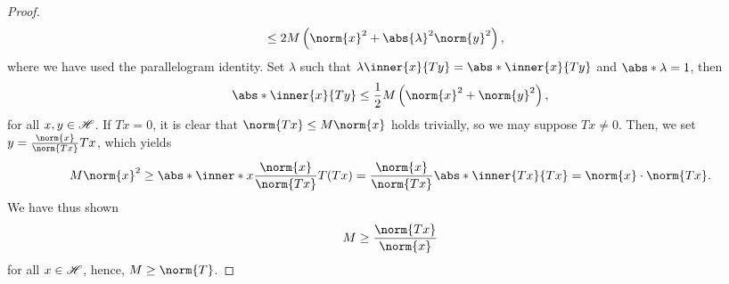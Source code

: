 \begin{proof}
\begin{align*}
                                                        &\leq 2M\left(\norm{x}^2 + \abs{\lambda}^2 \norm{y}^2\right),
    \end{align*}
    where we have used the parallelogram identity. Set \(\lambda\) such that \(\lambda \inner{x}{Ty} = \abs*{\inner{x}{Ty}}\) and \(\abs*{\lambda} = 1\), then
    \begin{equation*}
        \abs*{\inner{x}{Ty}} \leq \frac12 M \left(\norm{x}^2 + \norm{y}^2\right),
    \end{equation*}
    for all \(x, y \in \mathscr{H}\). If \(Tx = 0\), it is clear that \(\norm{Tx} \leq M \norm{x}\) holds trivially, so we may suppose \(Tx \neq 0\). Then, we set \(y = \frac{\norm{x}}{\norm{Tx}}Tx\), which yields
    \begin{equation*}
        M \norm{x}^2 \geq \abs*{\inner*{x}{\frac{\norm{x}}{\norm{Tx}}T(Tx)}} = \frac{\norm{x}}{\norm{Tx}} \abs*{\inner{Tx}{Tx}} = \norm{x}\cdot \norm{Tx}.
    \end{equation*}
    We have thus shown
    \begin{equation*}
        M \geq \frac{\norm{Tx}}{\norm{x}}
    \end{equation*}
    for all \(x \in \mathscr{H}\), hence, \(M \geq \norm{T}\).
\end{proof}

